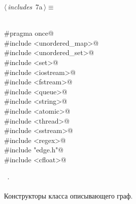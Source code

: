 \documentclass[12pt]{article}
\begin{document}
\begin{flushleft} \small
\begin{minipage}{\linewidth}\label{scrap7}\raggedright\small
{} $\langle\,${\itshape includes}\nobreak\ {\footnotesize {7a}}$\,\rangle\equiv$
\vspace{-1ex}
\begin{list}{}{} \item
\mbox{}\verb@@\\
\mbox{}\verb@#pragma once@\\
\mbox{}\verb@#include <unordered_map>@\\
\mbox{}\verb@#include <unordered_set>@\\
\mbox{}\verb@#include <set>@\\
\mbox{}\verb@#include <iostream>@\\
\mbox{}\verb@#include <fstream>@\\
\mbox{}\verb@#include <queue>@\\
\mbox{}\verb@#include <string>@\\
\mbox{}\verb@#include <atomic>@\\
\mbox{}\verb@#include <thread>@\\
\mbox{}\verb@#include <sstream>@\\
\mbox{}\verb@#include <regex>@\\
\mbox{}\verb@#include "edge.h"@\\
\mbox{}\verb@#include <cfloat>@\\
\mbox{}\verb@@{\NWsep}
\end{list}
\vspace{-1.5ex}
\footnotesize
\begin{list}{}{\setlength{\itemsep}{-\parsep}\setlength{\itemindent}{-\leftmargin}}
\item \NWtxtMacroRefIn\ .

\item{}
\end{list}
\end{minipage}\vspace{4ex}
\end{flushleft}
\paragraph{}
Конструкторы класса описывающего граф.
\end{document}
